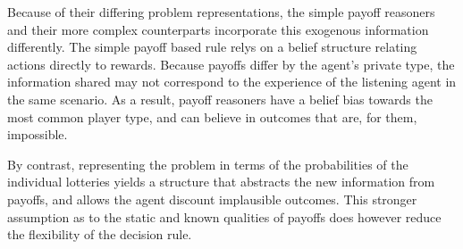 Because of their differing problem representations, the simple payoff reasoners and their more complex counterparts incorporate this exogenous information differently. The simple payoff based rule relys on a belief structure relating actions directly to rewards. Because payoffs differ by the agent's private type, the information shared may not correspond to the experience of the listening agent in the same scenario. As a result, payoff reasoners have a belief bias towards the most common player type, and can believe in outcomes that are, for them, impossible.

By contrast, representing the problem in terms of the probabilities of the individual lotteries yields a structure that abstracts the new information from payoffs, and allows the agent discount implausible outcomes. This stronger assumption as to the static and known qualities of payoffs does however reduce the flexibility of the decision rule.
